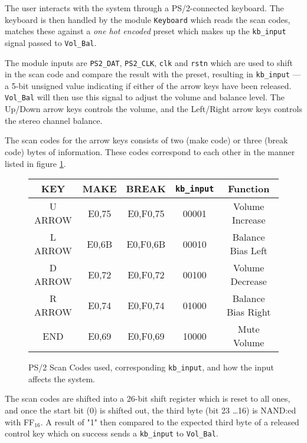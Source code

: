 The user interacts with the system through a PS/2-connected keyboard. The keyboard is then handled by the module \verb?Keyboard? which reads the scan codes, matches these against a \emph{one hot encoded} preset which makes up the \verb?kb_input? signal passed to \verb?Vol_Bal?.

The module inputs are \verb=PS2_DAT=, \verb=PS2_CLK=, \verb=clk= and \verb=rstn= which are used to shift in the scan code and compare the result with the preset, resulting in \verb=kb_input= --- a 5-bit unsigned value indicating if either of the arrow keys have been released. \verb=Vol_Bal= will then use this signal to adjust the volume and balance level. The Up/Down arrow keys controls the volume, and the Left/Right arrow keys controls the stereo channel balance.

The scan codes for the arrow keys consists of two (make code) or three (break code) bytes of information. These codes correspond to each other in the manner listed in figure \ref{fig:scancodes}. 

\begin{figure}[h]
\centering
\caption{PS/2 Scan Codes used, corresponding \texttt{kb\_input}, and how the input affects the system.}
\begin{tabular}{|c|c|c|c|c|}
\hline
KEY & MAKE & BREAK & \verb+kb_input+ & Function\\ \hline
U ARROW & E0,75 & E0,F0,75 & 00001 & Volume Increase\\ \hline
L ARROW & E0,6B & E0,F0,6B & 00010 & Balance Bias Left\\ \hline
D ARROW & E0,72 & E0,F0,72 & 00100 & Volume Decrease\\ \hline
R ARROW & E0,74 & E0,F0,74 & 01000 & Balance Bias Right\\ \hline
END		& E0,69 & E0,F0,69 & 10000 & Mute Volume\\ \hline
\end{tabular}
\label{fig:scancodes}
\end{figure}

The scan codes are shifted into a 26-bit shift register which is reset to all ones, and once the start bit (0) is shifted out, the third byte (bit 23 \ldots 16) is NAND:ed with FF$_{16}$. A result of "1" then compared to the expected third byte of a released control key which on success sends a \verb+kb_input+ to \verb+Vol_Bal+.

